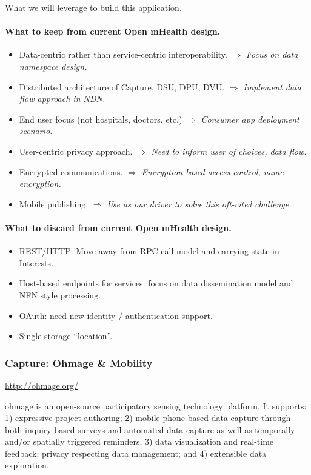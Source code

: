 What we will leverage to build this application.

\paragraph{What to keep from current Open mHealth design.}
\begin{itemize}
\item Data-centric rather than service-centric interoperability. $\Rightarrow$ \emph{Focus on data namespace design.}
\item Distributed architecture of Capture, DSU, DPU, DVU. $\Rightarrow$ \emph{Implement data flow approach in NDN.}
\item End user focus (not hospitals, doctors, etc.) $\Rightarrow$ \emph{Consumer app deployment scenario.}
\item User-centric privacy approach. $\Rightarrow$ \emph{Need to inform user of choices, data flow.}
\item Encrypted communications. $\Rightarrow$ \emph{Encryption-based access control, name encryption.}
\item Mobile publishing. $\Rightarrow$ \emph{Use as our driver to solve this oft-cited challenge.}
\end{itemize}

\paragraph{What to discard from current Open mHealth design.}
\begin{itemize}
\item REST/HTTP: Move away from RPC call model and carrying state in Interests.
\item Host-based endpoints for services:  focus on data dissemination model and NFN style processing. 
\item OAuth: need new identity / authentication support. 
\item Single storage ``location''. 
\end{itemize}


\subsubsection{Capture: Ohmage \& Mobility}

\url{http://ohmage.org/}

ohmage is an open-source participatory sensing technology platform. It supports: 1) expressive project authoring; 2) mobile phone-based data capture through both inquiry-based surveys and automated data capture as well as temporally and/or spatially triggered reminders, 3) data visualization and real-time feedback; privacy respecting data management; and 4) extensible data exploration. 

